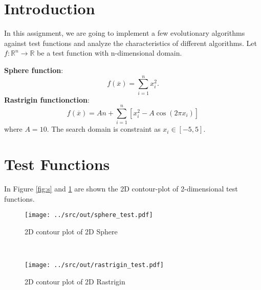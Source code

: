 \documentclass[a4paper,12pt]{article} %
\begin{document}
	\vspace{0.4cm}


\section{Introduction}
In this assignment, we are going to implement a few evolutionary algorithms against test functions and analyze the characteristics of different algorithms.
Let $f : \mathbb{R}^n \rightarrow \mathbb{R}$ be a test function with n-dimensional domain.

\noindent\textbf{Sphere function}:
	\begin{equation}
		f(\overline{x}) = \sum_{i=1}^nx_i^2 \mbox{.}
	\end{equation}
\textbf{Rastrigin functionction}:
	\begin{equation}
	f(\overline{x}) = An + \sum_{i=1}^n [x_i^2-A \cos(2\pi x_i)]
	\end{equation}
	where $A = 10$. The search domain is constraint as $x_i \in [-5, 5]$.

\section{Test Functions}

In Figure \ref{fig:s} and \ref{fig:r} are shown the 2D contour-plot of 2-dimensional test functions.

\begin{figure}[htb]
	\begin{minipage}[b]{.49\textwidth}
		\centering
		\texttt{[image: ../src/out/sphere\_test.pdf]}	
		\caption{2D contour plot of 2D Sphere}
		\label{fig:s}
	\end{minipage}
	~
	\begin{minipage}[b]{.49\textwidth}
		\centering
		\texttt{[image: ../src/out/rastrigin\_test.pdf]}	
		\caption{2D contour plot of 2D Rastrigin}
		\label{fig:r}
	\end{minipage}
\end{figure}
\end{document}
